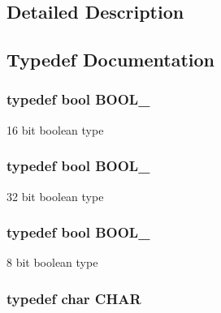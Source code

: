 \subsection{Detailed Description}


\subsection{Typedef Documentation}
\hypertarget{group___l_p_c___types___public___types_ga586a49bf86982ab05295515d1e4e35fe}{
\subsubsection[{B\+O\+O\+L\+\_\+16}]{\setlength{\rightskip}{0pt plus 5cm}typedef bool {\bf B\+O\+O\+L\+\_}}}\label{group___l_p_c___types___public___types_ga586a49bf86982ab05295515d1e4e35fe}
16 bit boolean type \hypertarget{group___l_p_c___types___public___types_gab02ba567b91b6b3d3c0c0209b2f577a0}{
\subsubsection[{B\+O\+O\+L\+\_\+32}]{\setlength{\rightskip}{0pt plus 5cm}typedef bool {\bf B\+O\+O\+L\+\_}}}\label{group___l_p_c___types___public___types_gab02ba567b91b6b3d3c0c0209b2f577a0}
32 bit boolean type \hypertarget{group___l_p_c___types___public___types_ga7cc7a8cc54a0a73fbfcc1eb0b792148d}{
\subsubsection[{B\+O\+O\+L\+\_\+8}]{\setlength{\rightskip}{0pt plus 5cm}typedef bool {\bf B\+O\+O\+L\+\_}}}\label{group___l_p_c___types___public___types_ga7cc7a8cc54a0a73fbfcc1eb0b792148d}
8 bit boolean type \hypertarget{group___l_p_c___types___public___types_gaebb9e13210d88d43e32e735ada43a425}{
\subsubsection[{C\+H\+A\+R}]{\setlength{\rightskip}{0pt plus 5cm}typedef char {\bf C\+H\+A\+R}}}\label{group___l_p_c___types___public___types_gaebb9e13210d88d43e32e735ada43a425}
